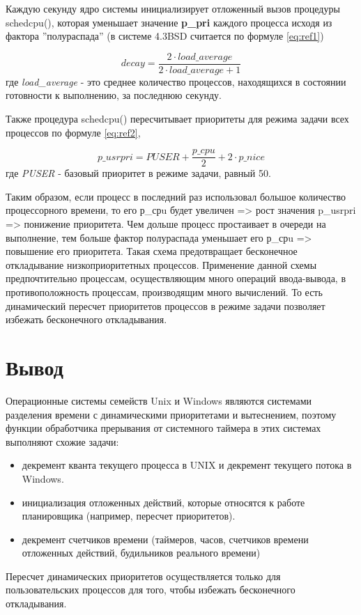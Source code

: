 \clearpage

Каждую секунду ядро системы инициализирует отложенный вызов процедуры schedcpu(), которая уменьшает значение \textbf{p\_pri} каждого процесса исходя из фактора ''полураспада'' (в системе 4.3BSD считается по формуле \ref{eq:ref1})

\begin{equation}
\label{eq:ref1}
decay = \frac{2 \cdot load\_average}{2 \cdot load\_average + 1}
\end{equation} где
\textit{load\_average} - это среднее количество процессов, находящихся в состоянии готовности к выполнению, за последнюю секунду.

Также процедура schedcpu() пересчитывает приоритеты для режима задачи
всех процессов по формуле \ref{eq:ref2},

\begin{equation}
\label{eq:ref2}
p\_usrpri = PUSER + \frac{p\_cpu}{2} + 2 \cdot p\_nice
\end{equation}где \textit{PUSER} - базовый приоритет в режиме задачи, равный 50.

Таким образом, если процесс в последний раз использовал большое количество процессорного времени, то его р\_срu будет увеличен => рост значения p\_usrpri => понижение приоритета.  Чем дольше процесс простаивает в очереди на выполнение, тем больше фактор полураспада уменьшает его р\_срu => повышение его приоритета. Такая схема предотвращает бесконечное откладывание низкоприоритетных процессов. Применение данной схемы предпочтительно процессам, осуществляющим много операций ввода-вывода, в противоположность процессам, производящим много вычислений. То есть динамический пересчет приоритетов процессов в режиме задачи позволяет избежать бесконечного откладывания.



\chapter{Вывод}

Операционные системы семейств Unix и Windows являются системами разделения времени с динамическими приоритетами и вытеснением, поэтому функции обработчика прерывания от системного таймера в этих системах выполняют схожие задачи:

\begin{itemize}
	\item декремент кванта текущего процесса в UNIX и декремент текущего потока в Windows.
	\item инициализация отложенных действий, которые относятся к работе планировщика (например, пересчет приоритетов).
	\item декремент счетчиков времени (таймеров, часов, счетчиков времени отложенных действий, будильников реального времени)
\end{itemize}

Пересчет динамических приоритетов осуществляется только для пользовательских процессов для того, чтобы избежать бесконечного откладывания.

